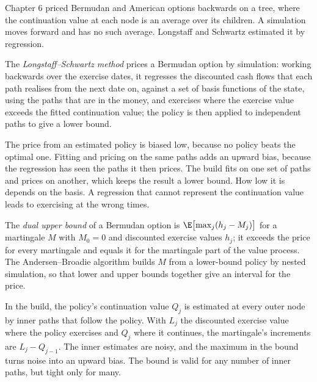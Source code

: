 Chapter 6 priced Bermudan and American options backwards on a tree, where the continuation value at each node is an average over its
children. A simulation moves forward and has no such average. Longstaff and Schwartz estimated it by regression.

\begin{definition}\label{def:dv:monte-carlo-pricers-in-practice:lsm}
The \emph{Longstaff--Schwartz method} prices a Bermudan option by simulation: working backwards over the
exercise dates, it regresses the discounted cash flows that each path realises from the next date on, against a set of basis functions of the
state, using the paths that are in the money, and exercises where the exercise value exceeds the fitted continuation value; the policy is then
applied to independent paths to give a lower bound.
\end{definition}

The price from an estimated policy is biased low, because no policy beats the optimal one. Fitting and pricing on the same paths adds an upward
bias, because the regression has seen the paths it then prices. The build fits on one set of paths and prices on another, which keeps the result
a lower bound. How low it is depends on the basis. A regression that cannot represent the continuation value leads to exercising at the wrong
times.

\begin{definition}\label{def:dv:monte-carlo-pricers-in-practice:dual}
The \emph{dual upper bound} of a Bermudan option is $\E\bigl[\max_j(h_j-M_j)\bigr]$ for a martingale $M$ with $M_0=0$
and discounted exercise values $h_j$; it exceeds the price for every martingale and equals it for the martingale part of the value process. The
Andersen--Broadie algorithm builds $M$ from a lower-bound policy by nested simulation, so that lower and upper bounds together give an interval
for the price.
\end{definition}

In the build, the policy's continuation value $Q_j$ is estimated at every outer node by inner paths that follow the policy. With $L_j$ the
discounted exercise value where the policy exercises and $Q_j$ where it continues, the martingale's increments are $L_j-Q_{j-1}$. The inner
estimates are noisy, and the maximum in the bound turns noise into an upward bias. The bound is valid for any number of inner paths, but tight only
for many.

